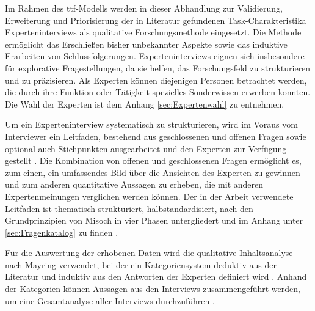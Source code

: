Im Rahmen des \ac{ttf}-Modells werden in dieser Abhandlung zur Validierung, Erweiterung und Priorisierung der in Literatur gefundenen Task-Charakteristika Experteninterviews als qualitative Forschungsmethode eingesetzt. Die Methode ermöglicht das Erschließen bisher unbekannter Aspekte sowie das induktive Erarbeiten von Schlussfolgerungen. Experteninterviews eignen sich insbesondere für explorative Fragestellungen, da sie helfen, das Forschungsfeld zu strukturieren und zu präzisieren. Als Experten können diejenigen Personen betrachtet werden, die durch ihre Funktion oder Tätigkeit spezielles Sonderwissen erwerben konnten. \autocite[Vgl.][S. 119-127]{MISOCH2019} Die Wahl der Experten ist dem Anhang \ref{sec:Expertenwahl} zu entnehmen.

Um ein Experteninterview systematisch zu strukturieren, wird im Voraus vom Interviewer ein Leitfaden, bestehend aus geschlossenen und offenen Fragen sowie optional auch Stichpunkten ausgearbeitet und den Experten zur Verfügung gestellt \autocite[Vgl.][S. 670]{HELFFERICH2019}. Die Kombination von offenen und geschlossenen Fragen ermöglicht es, zum einen, ein umfassendes Bild über die Ansichten des Experten zu gewinnen und zum anderen quantitative Aussagen zu erheben, die mit anderen Expertenmeinungen verglichen werden können. Der in der Arbeit verwendete Leitfaden ist thematisch strukturiert, halbstandardisiert, nach den Grundprinzipien von Misoch in vier Phasen untergliedert und im Anhang unter \ref{sec:Fragenkatalog} zu finden \autocite[Vgl.][S. 68f]{MISOCH2019}.  

Für die Auswertung der erhobenen Daten wird die qualitative Inhaltsanalyse nach Mayring verwendet, bei der ein Kategoriensystem deduktiv aus der Literatur und induktiv aus den Antworten der Experten definiert wird \autocite[Vgl.][S. 633-634]{MAYRING2019}. Anhand der Kategorien können Aussagen aus den Interviews zusammengeführt werden, um eine Gesamtanalyse aller Interviews durchzuführen \autocite[Vgl.][S. 74]{BOGNER2014}. 



